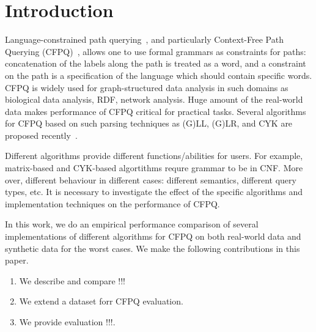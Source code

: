 \section{Introduction}

Language-constrained path querying~\cite{FLCpathProblem}, and particularly Context-Free Path Querying (CFPQ)~\cite{Yannakakis}, allows one to use formal grammars as constraints for paths: concatenation of the labels along the path is treated as a word, and a constraint on the path is a specification of the language which should contain specific words.
CFPQ is widely used for graph-structured data analysis in such domains as biological data analysis, RDF, network analysis.
Huge amount of the real-world data makes performance of CFPQ critical for practical tasks.
Several algorithms for CFPQ based on such parsing techniques as (G)LL, (G)LR, and CYK are proposed recently~\cite{hellingsPathQuerying,Grigorev:2017:CPQ:3166094.3166104,Verbitskaia:2018:PCC:3241653.3241655,RDF,10.1007/978-3-319-91662-0_17,Medeiros:2018:EEC:3167132.3167265}.

Different algorithms provide different functions/abilities for users.
For example, matrix-based and CYK-based algortithms requre grammar to be in CNF.
More over, different behaviour in different cases: different semantics, different query types, etc.
It is necessary to investigate the effect of the specific algorithms and implementation techniques on the performance of CFPQ.


In this work, we do an empirical performance comparison of several implementations of different algorithms for CFPQ on both real-world data and synthetic data for the worst cases.
We make the following contributions in this paper.

\begin{enumerate}
\item We describe and compare !!!
\item We extend a dataset forr CFPQ evaluation.
\item We provide evaluation !!!.
\end{enumerate}
